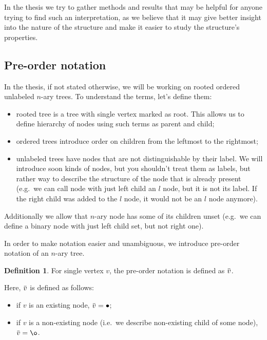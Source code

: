 \documentclass[final]{article}
\theoremstyle{definition}
\newtheorem{definition}{Definition}[subsection]
\theoremstyle{remark}
\newcommand{\ols}[1]{\mskip.5\thinmuskip\overline{\mskip-.5\thinmuskip {#1} \mskip-.5\thinmuskip}\mskip.5\thinmuskip} %
\newcommand{\enc}[1]{\ensuremath{\ols{#1}}}
\DeclareMathOperator{\n}{\bullet}
\DeclareMathOperator{\no}{\o}
\begin{document}
In the thesis we try to gather methods and results that may be helpful for anyone trying to find such an interpretation, as we believe that it may give better insight into the nature of the structure and make it easier to study the structure's properties.

\subsection{Pre-order notation}%
\label{sub:pre_order_notation}

In the thesis, if not stated otherwise, we will be working on rooted ordered unlabeled \(n\)-ary trees. To understand the terms, let's define them:
\begin{itemize}
    \item rooted tree is a tree with single vertex marked as root. This allows us to define hierarchy of nodes using such terms as parent and child;
    \item ordered trees introduce order on children from the leftmost to the rightmost;
    \item unlabeled trees have nodes that are not distinguishable by their label. We will introduce soon kinds of nodes, but you shouldn't treat them as labels, but rather way to describe the structure of the node that is already present (e.g.\ we can call node with just left child an \(l\) node, but it is not its label. If the right child was added to the \(l\) node, it would not be an \(l\) node anymore).
\end{itemize}
Additionally we allow that \(n\)-ary node has some of its children unset (e.g.\ we can define a binary node with just left child set, but not right one).

In order to make notation easier and unambiguous, we introduce pre-order notation of an \(n\)-ary tree.

\begin{definition}
    For single vertex \(v\), the pre-order notation is defined as \(\enc{v}\).
\end{definition}

Here, \(\enc{v}\) is defined as follows:
\begin{itemize}
    \item if \(v\) is an existing node, \(\enc{v} = \n\);
    \item if \(v\) is a non-existing node (i.e.\ we describe non-existing child of some node), \(\enc{v} = \no\).
\end{itemize}
\end{document}
